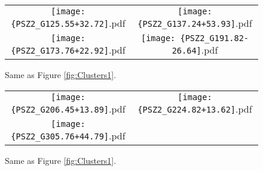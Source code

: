 \documentclass[apj, revtex4-1]{emulateapj}
\newcommand{\sdssg}{\hbox{$g$}}
\newcommand{\sdssr}{\hbox{$r$}}
\newcommand{\sdssi}{\hbox{$i$}}
\begin{document}
\begin{figure*}
	\centering
	\begin{tabular}{cc}
		\texttt{[image: \{PSZ2\_G125.55+32.72]}.pdf}&
		\texttt{[image: \{PSZ2\_G137.24+53.93]}.pdf}\\
		\texttt{[image: \{PSZ2\_G173.76+22.92]}.pdf}&
		\texttt{[image: \{PSZ2\_G191.82-26.64]}.pdf}
	\end{tabular}
	\caption{Same as Figure \ref{fig:Clusters1}.}
	\label{fig:Clusters3}
\end{figure*}

\begin{figure*}
	\centering
	\begin{tabular}{cc}
		\texttt{[image: \{PSZ2\_G206.45+13.89]}.pdf}&
		\texttt{[image: \{PSZ2\_G224.82+13.62]}.pdf}\\
		\texttt{[image: \{PSZ2\_G305.76+44.79]}.pdf}&
	\end{tabular}
	\caption{Same as Figure \ref{fig:Clusters1}.}
	\label{fig:Clusters4}
\end{figure*}
\end{document}
